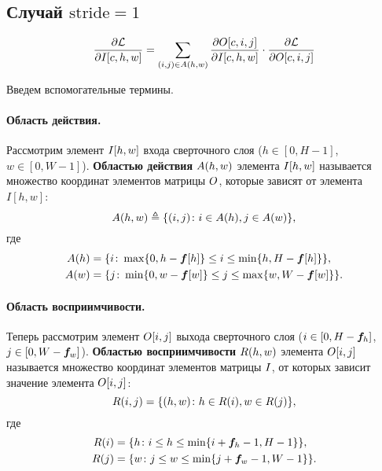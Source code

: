 \documentclass{report}
\numberwithin{theorem}{chapter}
\numberwithin{statement}{chapter}
\numberwithin{lemma}{chapter}
\theoremstyle{definition}
\numberwithin{task}{chapter}
\theoremstyle{remark}
\numberwithin{example}{chapter}
\theoremstyle{definition}
\numberwithin{definition}{chapter}
\theoremstyle{remark}
\theoremstyle{remark}
\numberwithin{lyrics}{section}
\begin{document}
\subsection{Случай $\text{stride} = 1$}

\begin{equation}
\frac{\partial \mathcal{L} }{\partial I[c, h, w]}= \sum\limits_{(i, j) \in A(h, w)} 
\frac{\partial O[c, i, j] }{\partial I[c, h, w]} \cdot \frac{\partial \mathcal{L} }{\partial O[c, i, j]}
\end{equation}

Введем вспомогательные термины. 

\paragraph{Область действия.}
Рассмотрим элемент $I[h, w]$ входа сверточного слоя ($h \in [0, H - 1]$, $w \in [0, W - 1]$). \textbf{Областью действия} $A(h, w)$ элемента $I[h, w]$ называется множество координат элементов матрицы $O$, которые зависят от элемента $I[h, w]$:
\begin{equation}
A(h, w) \triangleq \{(i, j)\colon i \in A(h), j\in A(w)\},
\end{equation}
где
\begin{align}
A(h)& = \{i \colon \max\{0, h - \boldsymbol{f}[h]\} \le i \le \min\{h, H - \boldsymbol{f}[h]\}\}, \\
A(w)& = \{j \colon \min\{0, w - \boldsymbol{f}[w]\} \le j \le \max\{w, W - \boldsymbol{f}[w]\}\}.
\end{align}

\paragraph{Область восприимчивости.}
Теперь рассмотрим элемент $O[i, j]$ выхода сверточного слоя ($i \in [0, H - \boldsymbol{f}_h]$, $j \in [0, W - \boldsymbol{f}_w]$). \textbf{Областью восприимчивости} $R(h, w)$ элемента $O[i, j]$ называется множество координат элементов матрицы $I$, от которых зависит значение элемента $O[i, j]$:
\begin{equation}
\label{eq:receptive_field}
R(i, j) = \{(h, w) \colon h \in R(i), w \in R(j)\},
\end{equation}
где
\begin{align}
\label{eq:receptive_field:add}
R(i) &= \{h \colon i \le h \le \min\{i + \boldsymbol{f}_h - 1, H - 1\}\}, \\
R(j) &= \{w \colon j \le w \le \min\{j + \boldsymbol{f}_w - 1, W - 1\}\}.
\end{align}
\end{document}
